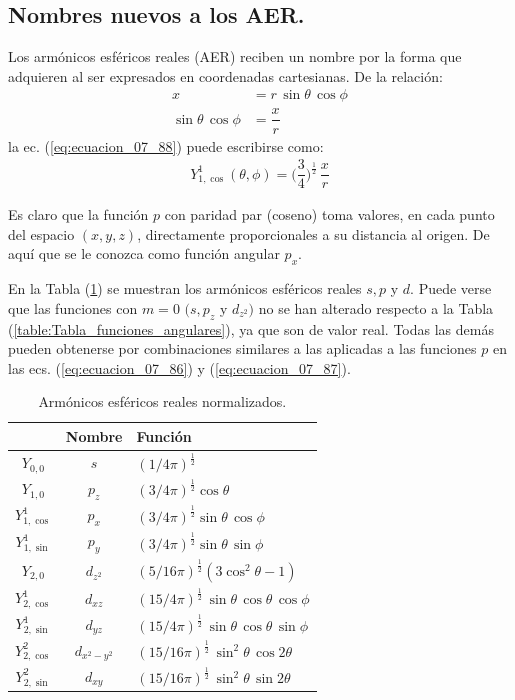 \subsection{Nombres nuevos a los AER.}

Los armónicos esféricos reales (AER) reciben un nombre por la forma que adquieren al ser expresados en coordenadas cartesianas. De la relación:
\begin{align*}
x &= r \, \sin \theta \, \cos \phi \\[0.5em]
\sin \theta \, \cos \phi &= \dfrac{x}{r}
\end{align*}
la ec. (\ref{eq:ecuacion_07_88}) puede escribirse como:
\begin{align*}
Y_{1, \cos}^{1} (\theta, \phi) = \bigg( \dfrac{3}{4} \bigg)^{\frac{1}{2}} \, \dfrac{x}{r}
\end{align*}

Es claro que la función $p$ con paridad par (coseno) toma valores, en cada punto del espacio $(x, y, z)$, directamente proporcionales a su distancia al origen. De aquí que se le conozca como función angular $p_{x}$.
\par
En la Tabla (\ref{table:Tabla_AERN}) se muestran los armónicos esféricos reales $s, p$ y $d$. Puede verse que las funciones con $m = 0$ $(s, p_{z}$ y $d_{z^{2}})$ no se han alterado respecto a la Tabla (\ref{table:Tabla_funciones_angulares}), ya que son de valor real. Todas las demás pueden obtenerse por combinaciones similares a las aplicadas a las funciones $p$ en las ecs. (\ref{eq:ecuacion_07_86}) y (\ref{eq:ecuacion_07_87}).
\begin{table}[H]
\centering
\large
\renewcommand{\arraystretch}{1.5}
\begin{tabular}{|c | c | l|} \hline
 & Nombre & Función \\ \hline
$Y_{0,0}$ & $s$ & $(1/4 \pi)^{\frac{1}{2}}$ \\ \hline
$Y_{1,0}$ & $p_{z}$ & $(3/4 \pi)^{\frac{1}{2}} \cos \theta$ \\ \hline
$Y_{1, \cos}^{1}$ & $p_{x}$ & $(3/4 \pi)^{\frac{1}{2}} \sin \theta \, \cos \phi$ \\ \hline
$Y_{1, \sin}^{1}$ & $p_{y}$ & $(3/4 \pi)^{\frac{1}{2}} \sin \theta \, \sin \phi$ \\ \hline
$Y_{2, 0}$ & $d_{z^{2}}$ & $(5/16 \pi)^{\frac{1}{2}} (3 \cos^{2} \theta  - 1)$ \\ \hline
$Y_{2, \cos}^{1}$ & $d_{xz}$ & $(15/4 \pi)^{\frac{1}{2}} \, \sin \theta \, \cos \theta \, \cos \phi$ \\ \hline
$Y_{2, \sin}^{1}$ & $d_{yz}$ & $(15/4 \pi)^{\frac{1}{2}} \, \sin \theta \, \cos \theta \, \sin \phi$ \\ \hline
$Y_{2, \cos}^{2}$ & $d_{x^{2}-y^{2}}$ & $(15/16 \pi)^{\frac{1}{2}} \, \sin^{2} \theta \, \cos 2 \theta$ \\ \hline
$Y_{2, \sin}^{2}$ & $d_{xy}$ & $(15/16 \pi)^{\frac{1}{2}} \, \sin^{2} \theta \, \sin 2 \theta$ \\ \hline
\end{tabular}
\caption{Armónicos esféricos reales normalizados.}
\label{table:Tabla_AERN}
\end{table}

